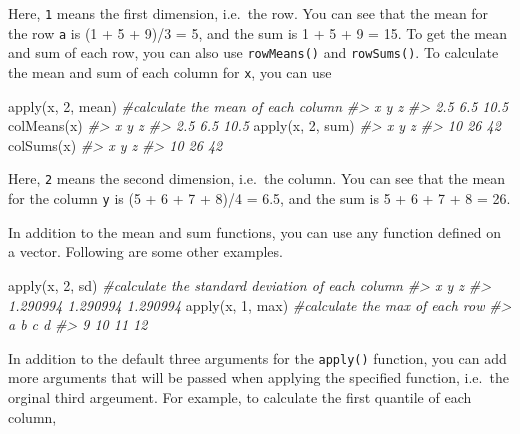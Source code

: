 \documentclass[
]{book}
\newenvironment{Shaded}{\begin{snugshade}}{\end{snugshade}}
\newcommand{\CommentTok}[1]{\textcolor[rgb]{0.56,0.35,0.01}{\textit{#1}}}
\newcommand{\DecValTok}[1]{\textcolor[rgb]{0.00,0.00,0.81}{#1}}
\newcommand{\FunctionTok}[1]{\textcolor[rgb]{0.00,0.00,0.00}{#1}}
\newcommand{\NormalTok}[1]{#1}
\begin{document}
Here, \texttt{1} means the first dimension, i.e.~the row. You can see that the mean for the row \texttt{a} is (1 + 5 + 9)/3 = 5, and the sum is 1 + 5 + 9 = 15. To get the mean and sum of each row, you can also use \texttt{rowMeans()} and \texttt{rowSums()}. To calculate the mean and sum of each column for \texttt{x}, you can use

\begin{Shaded}
\begin{Highlighting}[]
\FunctionTok{apply}\NormalTok{(x, }\DecValTok{2}\NormalTok{, mean)   }\CommentTok{\#calculate the mean of each column}
\CommentTok{\#\textgreater{}    x    y    z }
\CommentTok{\#\textgreater{}  2.5  6.5 10.5}
\FunctionTok{colMeans}\NormalTok{(x)}
\CommentTok{\#\textgreater{}    x    y    z }
\CommentTok{\#\textgreater{}  2.5  6.5 10.5}
\FunctionTok{apply}\NormalTok{(x, }\DecValTok{2}\NormalTok{, sum)}
\CommentTok{\#\textgreater{}  x  y  z }
\CommentTok{\#\textgreater{} 10 26 42}
\FunctionTok{colSums}\NormalTok{(x)}
\CommentTok{\#\textgreater{}  x  y  z }
\CommentTok{\#\textgreater{} 10 26 42}
\end{Highlighting}
\end{Shaded}

Here, \texttt{2} means the second dimension, i.e.~the column. You can see that the mean for the column \texttt{y} is (5 + 6 + 7 + 8)/4 = 6.5, and the sum is 5 + 6 + 7 + 8 = 26.

In addition to the mean and sum functions, you can use any function defined on a vector. Following are some other examples.

\begin{Shaded}
\begin{Highlighting}[]
\FunctionTok{apply}\NormalTok{(x, }\DecValTok{2}\NormalTok{, sd)     }\CommentTok{\#calculate the standard deviation of each column}
\CommentTok{\#\textgreater{}        x        y        z }
\CommentTok{\#\textgreater{} 1.290994 1.290994 1.290994}
\FunctionTok{apply}\NormalTok{(x, }\DecValTok{1}\NormalTok{, max)    }\CommentTok{\#calculate the max of each row}
\CommentTok{\#\textgreater{}  a  b  c  d }
\CommentTok{\#\textgreater{}  9 10 11 12}
\end{Highlighting}
\end{Shaded}

In addition to the default three arguments for the \texttt{apply()} function, you can add more arguments that will be passed when applying the specified function, i.e.~the orginal third argeument. For example, to calculate the first quantile of each column,
\end{document}
